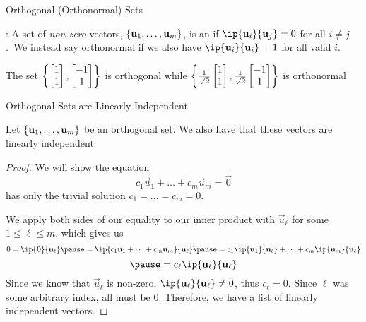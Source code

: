 \documentclass[xcoler=dvipsnames, aspectratio=169]{beamer}
\begin{document}
    \begin{frame}{Orthogonal (Orthonormal) Sets}
        \begin{defn}
            : A set of \emph{non-zero} vectors, 
            $\left\{\mathbf{u}_1,\dots,\mathbf{u}_m\right\}$, is an  if 
            $\ip{\vec{u}_i}{\vec{u}_j}=0$ for all $i\neq j$.\pause\ We instead say orthonormal
            if we also have $\ip{\vec{u}_i}{\vec{u}_i}=1$ for all valid $i$.
        \end{defn}
        \begin{example}
            The set $\left\{\begin{bmatrix}1\\1\end{bmatrix},\begin{bmatrix}-1\\1\end{bmatrix}\right\}$ is orthogonal while 
            $\left\{\frac{1}{\sqrt{2}}\begin{bmatrix}1\\1\end{bmatrix},\frac{1}{\sqrt{2}}\begin{bmatrix}-1\\1\end{bmatrix}\right\}$ is orthonormal
        \end{example}
    \end{frame}
    \begin{frame}{Orthogonal Sets are Linearly Independent}
        \small
        \begin{theorem}
            Let $\left\{\mathbf{u}_1,\dots,\mathbf{u}_m\right\}$ be an orthogonal set. We also have that
            these vectors are linearly independent
        \end{theorem}\pause
        \begin{proof}
            We will show the equation 
            \[
                c_1\vec{u}_1 + \dots + c_m\vec{u}_m = \vec{0}
            \]
            has only the trivial solution $c_1=\dots=c_m=0$.

            We apply both sides of our equality to our inner product with $\vec{u}_\ell$ for some
            $1\leq\ell\leq m$, which gives us
            \[
                0 = \ip{\vec{0}}{\vec{u}_\ell}\pause = 
                \ip{c_1\vec{u}_1 + \dots + c_m\vec{u}_m}{\vec{u}_\ell}
                \pause = c_1\ip{\vec{u}_1}{\vec{u}_\ell} + \dots + c_m\ip{\vec{u}_m}{\vec{u}_\ell}
            \]
            \vspace{-20pt}
            \[
                \pause = c_\ell\ip{\vec{u}_\ell}{\vec{u}_\ell}
            \]
            Since we know that $\vec{u}_\ell$ is non-zero, $\ip{\vec{u}_\ell}{\vec{u}_\ell}\neq 0$,
            thus $c_\ell=0$. Since $\ell$ was some arbitrary index, all must be $0$. Therefore,
            we have a list of linearly independent vectors.
        \end{proof}
    \end{frame}
\end{document}
